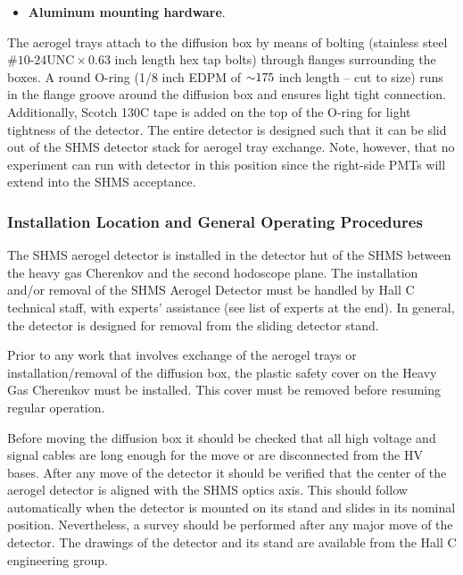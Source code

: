 {\begin{itemize}
\begin{itemize}
      of Millipore in the two lower refractive index trays (SP-15 and
      SP-11) to optimize light collection.
  \end{itemize}
  \item \textbf{Aluminum mounting hardware}.
\end{itemize}
The aerogel trays attach to the diffusion box by means of bolting
(stainless steel $\textrm{\#10-24UNC}\times 0.63$ inch length hex tap bolts) through
flanges surrounding the boxes. A round O-ring (1/8 inch EDPM of $\mathord{\sim} 175$
inch
length – cut to size) runs in the flange groove around the diffusion
box and ensures light tight connection. Additionally, Scotch 130C tape
is added on the top of the O-ring for light tightness of the
detector. The entire detector is designed such that it can be slid out
of the SHMS detector stack for aerogel tray exchange. Note, however,
that no experiment can run with detector in this position since the
right-side PMTs will extend into the SHMS acceptance.

\subsubsection{Installation Location and General Operating Procedures}
The SHMS aerogel detector is installed in the detector hut of the SHMS
between the heavy gas Cherenkov and the second hodoscope plane. The
installation and/or removal of the SHMS Aerogel Detector must be
handled by Hall C technical staff, with experts’ assistance (see list
of experts at the end). In general, the detector is designed for
removal from the sliding detector stand.

Prior to any work that involves exchange of the aerogel trays or
installation/removal of the diffusion box, the plastic safety cover on
the Heavy Gas Cherenkov must be installed. This cover must be removed
before resuming regular operation.

Before moving the diffusion box it should be checked that all high
voltage and signal cables are long enough for the move or are
disconnected from the HV bases. After any move of the detector it
should be verified that the center of the aerogel detector is aligned
with the SHMS optics axis. This should follow automatically when the
detector is mounted on its stand and slides in its nominal
position. Nevertheless, a survey should be performed after any major
move of the detector. The drawings of the detector and its stand are
available from the Hall C engineering group.

}

